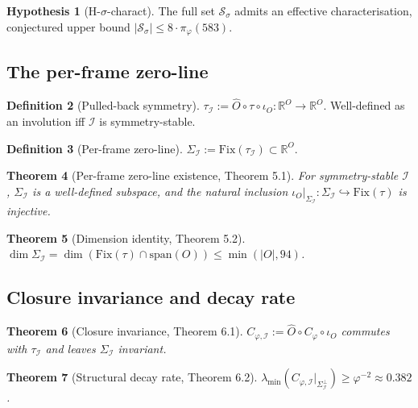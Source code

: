 \documentclass[11pt]{article}
\theoremstyle{plain}
\newtheorem{theorem}{Theorem}[section]
\theoremstyle{definition}
\newtheorem{definition}[theorem]{Definition}
\newtheorem{hypothesis}[theorem]{Hypothesis}
\theoremstyle{remark}
\newcommand{\Ical}{\mathcal{I}}
\newcommand{\Fix}{\mathrm{Fix}}
\newcommand{\Cph}{C_\varphi}
\begin{document}
\begin{hypothesis}[H-$\sigma$-charact]\label{hyp:sigma-charact}
The full set $\mathcal{S}_\sigma$ admits an effective characterisation, conjectured upper bound $|\mathcal{S}_\sigma| \leq 8 \cdot \pi_\varphi(583)$.
\end{hypothesis}

\subsection{The per-frame zero-line}

\begin{definition}[Pulled-back symmetry]
$\tau_\Ical := \hat{O} \circ \tau \circ \iota_O : \mathbb{R}^O \to \mathbb{R}^O$. Well-defined as an involution iff $\Ical$ is symmetry-stable.
\end{definition}

\begin{definition}[Per-frame zero-line]\label{def:sigma-frame}
$\Sigma_\Ical := \Fix(\tau_\Ical) \subset \mathbb{R}^O$.
\end{definition}

\begin{theorem}[Per-frame zero-line existence, \citet{PerObserverZeroLine} Theorem 5.1]\label{thm:sigma-frame-existence}
For symmetry-stable $\Ical$, $\Sigma_\Ical$ is a well-defined subspace, and the natural inclusion $\iota_O|_{\Sigma_\Ical}: \Sigma_\Ical \hookrightarrow \Fix(\tau)$ is injective.
\end{theorem}

\begin{theorem}[Dimension identity, \citet{PerObserverZeroLine} Theorem 5.2]\label{thm:sigma-frame-dim}
$\dim \Sigma_\Ical = \dim(\Fix(\tau) \cap \mathrm{span}(O)) \leq \min(|O|, 94)$.
\end{theorem}

\subsection{Closure invariance and decay rate}

\begin{theorem}[Closure invariance, \citet{PerObserverZeroLine} Theorem 6.1]\label{thm:closure-invariance}
$C_{\varphi,\Ical} := \hat{O} \circ \Cph \circ \iota_O$ commutes with $\tau_\Ical$ and leaves $\Sigma_\Ical$ invariant.
\end{theorem}

\begin{theorem}[Structural decay rate, \citet{PerObserverZeroLine} Theorem 6.2]\label{thm:decay}
$\lambda_{\min}(C_{\varphi,\Ical}|_{\Sigma_\Ical^\perp}) \geq \varphi^{-2} \approx 0.382$.
\end{theorem}
\end{document}
